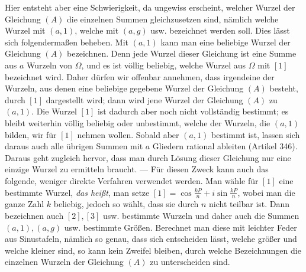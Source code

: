 Hier entsteht aber eine Schwierigkeit, da ungewiss erscheint, welcher Wurzel der Gleichung \((A)\) die einzelnen Summen gleichzusetzen sind, nämlich welche Wurzel mit \((a,1)\), welche mit \((a,g)\) usw. bezeichnet werden soll. Dies lässt sich folgendermaßen beheben. Mit \((a,1)\) kann man eine beliebige Wurzel der Gleichung \((A)\) bezeichnen. Denn jede Wurzel dieser Gleichung ist eine Summe aus \(a\) Wurzeln von \(\Omega\), und es ist völlig beliebig, welche Wurzel aus \(\Omega\) mit \([1]\) bezeichnet wird. Daher dürfen wir offenbar annehmen, dass irgendeine der Wurzeln, aus denen eine beliebige gegebene Wurzel der Gleichung \((A)\) besteht, durch \([1]\) dargestellt wird; dann wird jene Wurzel der Gleichung \((A)\) zu \((a,1)\). Die Wurzel \([1]\) ist dadurch aber noch nicht vollständig bestimmt; es bleibt weiterhin völlig beliebig oder unbestimmt, welche der Wurzeln, die \((a,1)\) bilden, wir für \([1]\) nehmen wollen. Sobald aber \((a,1)\) bestimmt ist, lassen sich daraus auch alle übrigen Summen mit \(a\) Gliedern rational ableiten (Artikel 346). Daraus geht zugleich hervor, dass man durch Lösung dieser Gleichung nur eine einzige Wurzel zu ermitteln braucht. — Für diesen Zweck kann auch das folgende, weniger direkte Verfahren verwendet werden. Man wähle für \([1]\) eine bestimmte Wurzel, \textit{das heißt}, man setze \([1]=\cos\frac{kP}{n}+i\sin\frac{kP}{n}\), wobei man die ganze Zahl \(k\) beliebig, jedoch so wählt, dass sie durch \(n\) nicht teilbar ist. Dann bezeichnen auch \([2],\allowbreak [3]\) usw. bestimmte Wurzeln und daher auch die Summen \((a,1),\allowbreak (a,g)\) usw. bestimmte Größen. Berechnet man diese mit leichter Feder aus Sinustafeln, nämlich so genau, dass sich entscheiden lässt, welche größer und welche kleiner sind, so kann kein Zweifel bleiben, durch welche Bezeichnungen die einzelnen Wurzeln der Gleichung \((A)\) zu unterscheiden sind.

